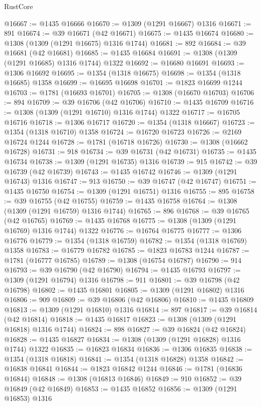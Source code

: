 \begin{lexlean}{RustCore}
\begin{coremodule}
@16667 := @1435 @16666
@16670 := @1309 (@1291 @16667) @1316
@16671 := 891
@16674 := @39 @16671 (@42 @16671)
@16675 := @1435 @16674
@16680 := @1308 (@1309 (@1291 @16675) @1316 @1744)
@16681 := 892
@16684 := @39 @16681 (@42 @16681)
@16685 := @1435 @16684
@16691 := @1308 (@1309 (@1291 @16685) @1316 @1744) @1322
@16692 := @16680 @16691
@16693 := @1306 @16692
@16695 := @1354 (@1318 @16675)
@16698 := @1354 (@1318 @16685) @1358
@16699 := @16695 @16698
@16701 := @1823 @16699 @1244
@16703 := @1781 (@16693 @16701)
@16705 := @1308 (@16670 @16703)
@16706 := 894
@16709 := @39 @16706 (@42 @16706)
@16710 := @1435 @16709
@16716 := @1308 (@1309 (@1291 @16710) @1316 @1744) @1322
@16717 := @16705 @16716
@16718 := @1306 @16717
@16720 := @1354 (@1318 @16667)
@16723 := @1354 (@1318 @16710) @1358
@16724 := @16720 @16723
@16726 := @2169 @16724 @1244
@16728 := @1781 (@16718 @16726)
@16730 := @1308 (@16662 @16728)
@16731 := 918
@16734 := @39 @16731 (@42 @16731)
@16735 := @1435 @16734
@16738 := @1309 (@1291 @16735) @1316
@16739 := 915
@16742 := @39 @16739 (@42 @16739)
@16743 := @1435 @16742
@16746 := @1309 (@1291 @16743) @1316
@16747 := 913
@16750 := @39 @16747 (@42 @16747)
@16751 := @1435 @16750
@16754 := @1309 (@1291 @16751) @1316
@16755 := 895
@16758 := @39 @16755 (@42 @16755)
@16759 := @1435 @16758
@16764 := @1308 (@1309 (@1291 @16759) @1316 @1744)
@16765 := 896
@16768 := @39 @16765 (@42 @16765)
@16769 := @1435 @16768
@16775 := @1308 (@1309 (@1291 @16769) @1316 @1744) @1322
@16776 := @16764 @16775
@16777 := @1306 @16776
@16779 := @1354 (@1318 @16759)
@16782 := @1354 (@1318 @16769) @1358
@16783 := @16779 @16782
@16785 := @1823 @16783 @1244
@16787 := @1781 (@16777 @16785)
@16789 := @1308 (@16754 @16787)
@16790 := 914
@16793 := @39 @16790 (@42 @16790)
@16794 := @1435 @16793
@16797 := @1309 (@1291 @16794) @1316
@16798 := 911
@16801 := @39 @16798 (@42 @16798)
@16802 := @1435 @16801
@16805 := @1309 (@1291 @16802) @1316
@16806 := 909
@16809 := @39 @16806 (@42 @16806)
@16810 := @1435 @16809
@16813 := @1309 (@1291 @16810) @1316
@16814 := 897
@16817 := @39 @16814 (@42 @16814)
@16818 := @1435 @16817
@16823 := @1308 (@1309 (@1291 @16818) @1316 @1744)
@16824 := 898
@16827 := @39 @16824 (@42 @16824)
@16828 := @1435 @16827
@16834 := @1308 (@1309 (@1291 @16828) @1316 @1744) @1322
@16835 := @16823 @16834
@16836 := @1306 @16835
@16838 := @1354 (@1318 @16818)
@16841 := @1354 (@1318 @16828) @1358
@16842 := @16838 @16841
@16844 := @1823 @16842 @1244
@16846 := @1781 (@16836 @16844)
@16848 := @1308 (@16813 @16846)
@16849 := 910
@16852 := @39 @16849 (@42 @16849)
@16853 := @1435 @16852
@16856 := @1309 (@1291 @16853) @1316

\end{coremodule}
\end{lexlean}
